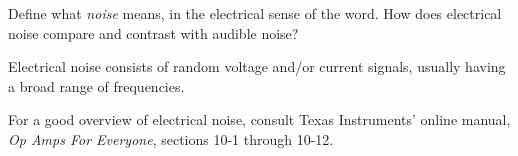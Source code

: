 

Define what {\it noise} means, in the electrical sense of the word.  How does electrical noise compare and contrast with audible noise?







Electrical noise consists of random voltage and/or current signals, usually having a broad range of frequencies.







For a good overview of electrical noise, consult Texas Instruments' online manual, {\it Op Amps For Everyone}, sections 10-1 through 10-12.




